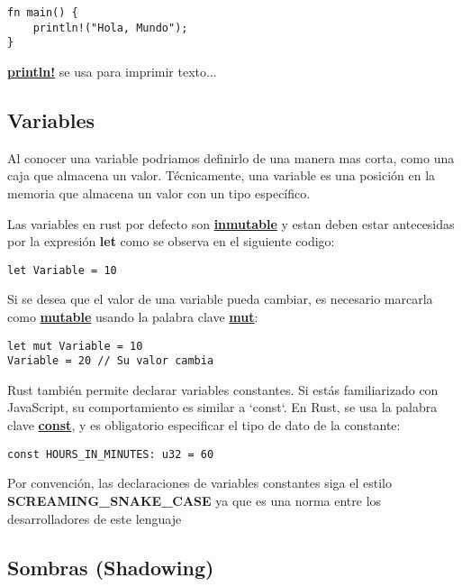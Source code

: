 \documentclass[12pt]{article}
\begin{document}
\noindent


	\begin{lstlisting}[style=ruststyle]
fn main() {
	println!("Hola, Mundo");
}
	\end{lstlisting}
	\hyperlink{println}{\textbf{println!}} se usa para imprimir texto...



	\subsection{Variables}
	Al conocer una variable podriamos definirlo de una manera mas corta, como una caja que almacena un valor. Técnicamente, una variable es una posición en la memoria que almacena un valor con un tipo específico.

	Las variables en rust por defecto son \hyperlink{inmutable}{\textbf{inmutable}} y estan deben estar antecesidas por la expresión \textbf{let} como se observa en el siguiente codigo:

\begin{lstlisting}[style=ruststyle]
let Variable = 10
\end{lstlisting}

	Si se desea que el valor de una variable pueda cambiar, es necesario marcarla como \hyperlink{mutable}{\textbf{mutable}} usando la palabra clave \hyperlink{mut}{ \textbf{mut}}:

\begin{lstlisting}[style=ruststyle]
let mut Variable = 10
Variable = 20 // Su valor cambia
\end{lstlisting}

	Rust también permite declarar variables constantes. Si estás familiarizado con JavaScript, su comportamiento es similar a `const`. En Rust, se usa la palabra clave \hyperlink{const}{\textbf{const}}, y es obligatorio especificar el tipo de dato de la constante:

\begin{lstlisting}[style=ruststyle]
const HOURS_IN_MINUTES: u32 = 60
\end{lstlisting}

	Por convención, las declaraciones de variables constantes siga el estilo \textbf{SCREAMING\_SNAKE\_CASE} ya que es una norma entre los desarrolladores de este lenguaje



	\subsection{Sombras (Shadowing)}
\end{document}
